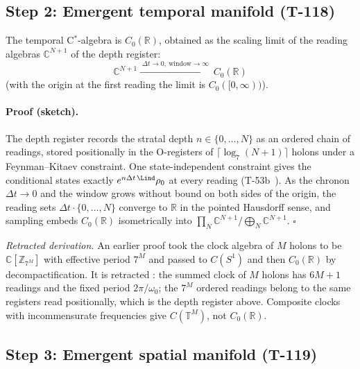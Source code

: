 \subsection{Step 2: Emergent temporal manifold (T-118)}

\begin{theorembox}
The temporal C$^*$-algebra is $C_0(\mathbb{R})$, obtained as the scaling limit of the
reading algebras $\mathbb{C}^{N+1}$ of the depth register:
\begin{equation}
  \mathbb{C}^{N+1}
  \xrightarrow{\;\Delta t \to 0,\ \text{window} \to \infty\;}
  C_0(\mathbb{R})
  \label{eq:temporal-algebra}
\end{equation}
(with the origin at the first reading the limit is $C_0([0,\infty))$).
\end{theorembox}

\paragraph{Proof (sketch).}
The depth register records the stratal depth $n \in \{0,\dots,N\}$ as an ordered chain of
readings, stored positionally in the O-registers of $\lceil\log_7(N+1)\rceil$ holons under
a Feynman--Kitaev constraint. One state-independent constraint gives the conditional states
exactly $e^{n\Delta t\,\Lind}\rho_0$ at every reading (T-53b~). As the chronon
$\Delta t \to 0$ and the window grows without bound on both sides of the origin, the
reading sets $\Delta t\cdot\{0,\dots,N\}$ converge to $\mathbb{R}$ in the pointed Hausdorff
sense, and sampling embeds $C_0(\mathbb{R})$ isometrically into
$\prod_N \mathbb{C}^{N+1}/\bigoplus_N \mathbb{C}^{N+1}$. $\square$

\noindent\emph{Retracted derivation.} An earlier proof took the clock algebra of $M$
holons to be $\mathbb{C}[\mathbb{Z}_{7^M}]$ with effective period $7^M$ and passed to
$C(S^1)$ and then $C_0(\mathbb{R})$ by decompactification. It is retracted
\status{$\times$}: the summed clock of $M$ holons has $6M+1$ readings and the fixed period
$2\pi/\omega_0$; the $7^M$ ordered readings belong to the same registers read
positionally, which is the depth register above. Composite clocks with incommensurate
frequencies give $C(\mathbb{T}^M)$, not $C_0(\mathbb{R})$.

\subsection{Step 3: Emergent spatial manifold (T-119)}

